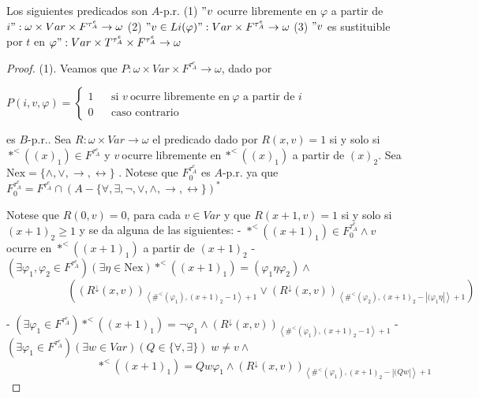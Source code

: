   \begin{lemma}
    Los siguientes predicados son \(A\)-p.r.
    (1) \("v\) ocurre libremente en \(\varphi \) a partir de \(i":\omega \times Var\times F^{\tau _{A}^{e}}\rightarrow \omega \)
    (2) \("v\in Li(\varphi )":Var\times F^{\tau _{A}^{e}}\rightarrow \omega \)
    (3) \("v\) es sustituible por \(t\) en \(\varphi ":Var\times T^{\tau _{A}^{e}}\times F^{\tau _{A}^{e}}\rightarrow \omega \)
  \end{lemma}
  \begin{proof}
    (1). Veamos que \(P:\omega \times Var\times F^{\tau _{A}^{e}}\rightarrow \omega \), dado por

    \(\displaystyle P(i,v,\varphi )=\left\{ \begin{array}{ccl} 1 & & \text{si }v\mathit{\ }\text{ocurre libremente en}\mathit{\ }\varphi \text{ a partir de }i \\ 0 & & \text{caso contrario} \end{array} \right. \)

    es \(B\)-p.r.. Sea \(R:\omega \times Var\rightarrow \omega \) el predicado dado por \(R(x,v)=1\) si y solo si \(\ast ^{< }((x)_{1})\in F^{\tau _{A}^{e}}\) y \(v \mathit{\ }\)ocurre libremente en\(\mathit{\ }\ast ^{< }((x)_{1})\) a partir de \( (x)_{2}\). Sea \(\mathrm{Nex}=\{\wedge ,\vee ,\rightarrow ,\leftrightarrow \}\) . Notese que \(F_{0}^{\tau _{A}^{e}}\) es \(A\)-p.r. ya que
    \(\displaystyle F_{0}^{\tau _{A}^{e}}=F^{\tau _{A}^{e}}\cap (A-\{\forall ,\exists ,\lnot ,\vee ,\wedge ,\rightarrow ,\leftrightarrow \})^{\ast } \)

    Notese que \(R(0,v)=0\), para cada \(v\in Var\) y que \(R(x+1,v)=1\) si y solo si \( (x+1)_{2}\geq 1\) y se da alguna de las siguientes:
    - \(\ast ^{< }((x+1)_{1})\in F_{0}^{\tau _{A}^{e}}\wedge v\) ocurre en \( \ast ^{< }((x+1)_{1})\) a partir de \((x+1)_{2}\)
    - \((\exists \varphi _{1},\varphi _{2}\in F^{\tau _{A}^{e}})(\exists \eta \in \mathrm{Nex})\ast ^{< }((x+1)_{1})=(\varphi _{1}\eta \varphi _{2})\wedge \)
    \(\ \ \ \ \ \ \ \ \ \ \ \ \ \ \ \ \ \ \ \ \ \ \ \ \ \left( (R^{\downarrow }(x,v))_{\left\langle \#^{< }(\varphi _{1}),(x+1)_{2}-1\right\rangle +1}\vee (R^{\downarrow }(x,v))_{\left\langle \#^{< }(\varphi _{2}),(x+1)_{2}-\left\vert (\varphi _{1}\eta \right\vert \right\rangle +1}\right) \)

    - \((\exists \varphi _{1}\in F^{\tau _{A}^{e}})\ast ^{< }((x+1)_{1})=\lnot \varphi _{1}\wedge (R^{\downarrow }(x,v))_{\left\langle \#^{< }(\varphi _{1}),(x+1)_{2}-1\right\rangle +1}\)
    - \((\exists \varphi _{1}\in F^{\tau _{A}^{e}})(\exists w\in Var)(Q\in \{\forall ,\exists \})\;w\neq v\wedge \)
    \(\ \ \ \ \ \ \ \ \ \ \ \ \ \ \ \ \ \ \ \ \ \ \ \ \ \ \ \ \ \ \ \ \ \ \ \ \ \ast ^{< }((x+1)_{1})=Qw\varphi _{1}\wedge (R^{\downarrow }(x,v))_{\left\langle \#^{< }(\varphi _{1}),(x+1)_{2}-\left\vert (Qw\right\vert \right\rangle +1}\)


\end{proof}
